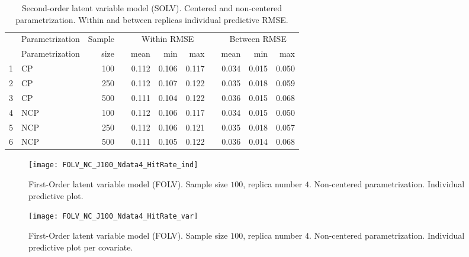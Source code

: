 \begin{table}[H]
	\centering
	\begin{tabular}{rlrrrrrrrrr}
		\hline
		& Parametrization & Sample && \multicolumn{3}{c}{ Within RMSE } && \multicolumn{3}{c}{ Between RMSE } \\
		\cmidrule(rl){5-7} \cmidrule(rl){9-11}  
		& Parametrization & size  && mean & min & max && mean & min & max \\ 
		\hline\hline
		1 & CP & 100 && 0.112 & 0.106 & 0.117 && 0.034 & 0.015 & 0.050 \\ 
		2 & CP & 250 && 0.112 & 0.107 & 0.122 && 0.035 & 0.018 & 0.059 \\ 
		3 & CP & 500 && 0.111 & 0.104 & 0.122 && 0.036 & 0.015 & 0.068 \\ 
		4 & NCP & 100 && 0.112 & 0.106 & 0.117 && 0.034 & 0.015 & 0.050 \\
		5 & NCP & 250 && 0.112 & 0.106 & 0.121 && 0.035 & 0.018 & 0.057 \\
		6 & NCP & 500 && 0.111 & 0.105 & 0.122 && 0.036 & 0.014 & 0.068 \\ 
		\hline
	\end{tabular}
	\caption[Second-order latent variable model (SOLV). Centered and non-centered parametrization. Within and between replicas predictive RMSE.]%
	{Second-order latent variable model (SOLV). Centered and non-centered parametrization. Within and between replicas individual predictive RMSE.}
	\label{tab:SOLV_accuracy}
\end{table}
%
\begin{figure}[H]
	\centering
	\texttt{[image: FOLV\_NC\_J100\_Ndata4\_HitRate\_ind]}
	\caption[First-Order latent variable model (FOLV). Sample size $100$, replica number $4$. Non-centered parametrization. Individual predictive plot.]%
	{First-Order latent variable model (FOLV). Sample size $100$, replica number $4$. Non-centered parametrization. Individual predictive plot.}
	\label{fig:FOLV_NC_hitrate_ind}
\end{figure}
%
\begin{figure}[H]
	\centering
	\texttt{[image: FOLV\_NC\_J100\_Ndata4\_HitRate\_var]}
	\caption[First-Order latent variable model (FOLV). Sample size $100$, replica number $4$. Non-centered parametrization. Individual predictive plot per covariate.]%
	{First-Order latent variable model (FOLV). Sample size $100$, replica number $4$. Non-centered parametrization. Individual predictive plot per covariate.}
	\label{fig:FOLV_NC_hitrate_var}
\end{figure}



